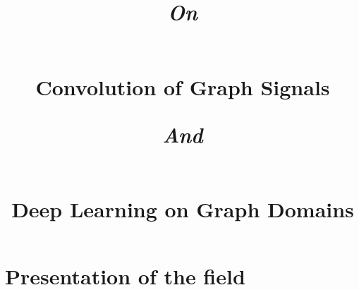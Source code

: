 \documentclass[12pt]{book}
\begin{document}

%
%

\newline



%
%

\title{\begin{large}\emph{On}\end{large}\\Convolution of Graph Signals\\\begin{large}\emph{And}\end{large}\\Deep Learning on Graph Domains}
\date{}
\maketitle

%
%



%
%

 \dominitoc
 \tableofcontents
 \adjustmtc


%
%



%
%

  \chapter{Presentation of the field}\label{chap:1}
  \minitoc\newpage
  \newpage

  \newpage
  \newpage
  \newpage
\end{document}
